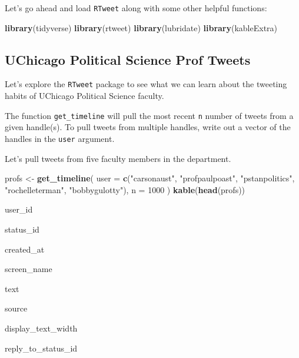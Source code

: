 \documentclass[]{book}
\newenvironment{Shaded}{\begin{snugshade}}{\end{snugshade}}
\newcommand{\DataTypeTok}[1]{\textcolor[rgb]{0.13,0.29,0.53}{#1}}
\newcommand{\DecValTok}[1]{\textcolor[rgb]{0.00,0.00,0.81}{#1}}
\newcommand{\KeywordTok}[1]{\textcolor[rgb]{0.13,0.29,0.53}{\textbf{#1}}}
\newcommand{\NormalTok}[1]{#1}
\newcommand{\StringTok}[1]{\textcolor[rgb]{0.31,0.60,0.02}{#1}}
\begin{document}
Let's go ahead and load \texttt{RTweet} along with some other helpful functions:

\begin{Shaded}
\begin{Highlighting}[]
\KeywordTok{library}\NormalTok{(tidyverse)}
\KeywordTok{library}\NormalTok{(rtweet)}
\KeywordTok{library}\NormalTok{(lubridate)}
\KeywordTok{library}\NormalTok{(kableExtra)}
\end{Highlighting}
\end{Shaded}

\hypertarget{uchicago-political-science-prof-tweets}{%
\subsection{UChicago Political Science Prof Tweets}\label{uchicago-political-science-prof-tweets}}

Let's explore the \texttt{RTweet} package to see what we can learn about the tweeting habits of UChicago Political Science faculty.

The function \texttt{get\_timeline} will pull the most recent \texttt{n} number of tweets from a given handle(s). To pull tweets from multiple handles, write out a vector of the handles in the \texttt{user} argument.

Let's pull tweets from five faculty members in the department.

\begin{Shaded}
\begin{Highlighting}[]
\NormalTok{profs <-}\StringTok{ }\KeywordTok{get_timeline}\NormalTok{(}
  \DataTypeTok{user =} \KeywordTok{c}\NormalTok{(}\StringTok{"carsonaust"}\NormalTok{, }\StringTok{"profpaulpoast"}\NormalTok{, }\StringTok{"pstanpolitics"}\NormalTok{, }\StringTok{"rochelleterman"}\NormalTok{, }\StringTok{"bobbygulotty"}\NormalTok{),}
  \DataTypeTok{n =} \DecValTok{1000}
\NormalTok{)}
\KeywordTok{kable}\NormalTok{(}\KeywordTok{head}\NormalTok{(profs))}
\end{Highlighting}
\end{Shaded}

user\_id

status\_id

created\_at

screen\_name

text

source

display\_text\_width

reply\_to\_status\_id
\end{document}
